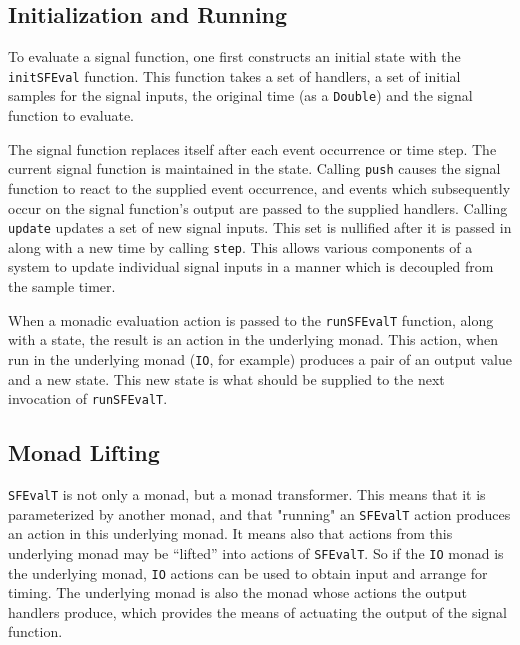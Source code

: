 \subsection{Initialization and Running}
To evaluate a signal function, one first constructs an initial state
with the {\tt initSFEval} function. This function takes a set of
handlers, a set of initial samples for the signal inputs, the original
time (as a {\tt Double}) and the signal function to evaluate.

The signal function replaces itself after each event occurrence or time
step. The current signal function is maintained in the state. Calling
{\tt push} causes the signal function to react to the supplied event 
occurrence, and events which subsequently occur on the signal function's
output are passed to the supplied handlers. Calling {\tt update} updates
a set of new signal inputs. This set is nullified after it is passed in
along with a new time by calling {\tt step}. This allows various
components of a system to update individual signal inputs in a manner which is
decoupled from the sample timer.

When a monadic evaluation action is passed to the {\tt runSFEvalT} function,
along with a state, the result is an action in the underlying monad. This
action, when run in the underlying monad ({\tt IO}, for example) produces
a pair of an output value and a new state. This new state is what should be 
supplied to the next invocation of {\tt runSFEvalT}.

\subsection{Monad Lifting}

{\tt SFEvalT} is not only a monad, but a monad transformer. This means that
it is parameterized by another monad, and that "running" an {\tt SFEvalT}
action produces an action in this underlying monad. It means also that actions
from this underlying monad may be ``lifted'' into actions of {\tt SFEvalT}.
So if the {\tt IO} monad is the underlying monad, {\tt IO} actions can be 
used to obtain input and arrange for timing. The underlying monad is also the
monad whose actions the output handlers produce, which provides the means of
actuating the output of the signal function.
